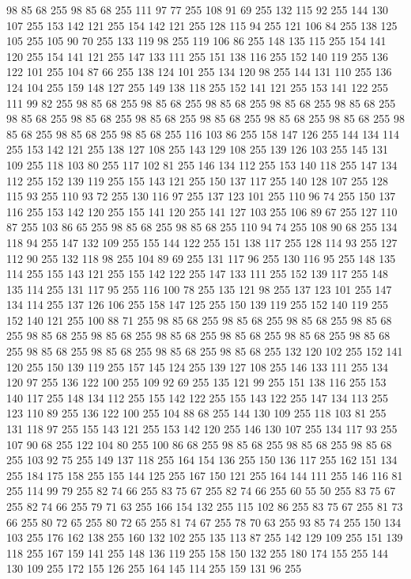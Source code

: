 98 85 68 255 98 85 68 255 111 97 77 255 108 91 69 255 132 115 92 255 144 130 107 255 153 142 121 255 154 142 121 255 128 115 94 255 121 106 84 255 138 125 105 255 105 90 70 255 133 119 98 255 119 106 86 255 148 135 115 255 154 141 120 255 154 141 121 255 147 133 111 255 151 138 116 255 152 140 119 255 136 122 101 255 104 87 66 255 138 124 101 255 134 120 98 255 144 131 110 255 136 124 104 255 159 148 127 255 149 138 118 255 152 141 121 255 153 141 122 255 111 99 82 255 98 85 68 255 98 85 68 255 98 85 68 255 98 85 68 255 98 85 68 255 98 85 68 255 98 85 68 255 98 85 68 255 98 85 68 255 98 85 68 255 98 85 68 255 98 85 68 255 98 85 68 255 98 85 68 255 116 103 86 255 158 147 126 255 144 134 114 255 153 142 121 255 138 127 108 255 143 129 108 255 139 126 103 255 145 131 109 255 118 103 80 255 117 102 81 255 146 134 112 255 153 140 118 255 147 134 112 255 152 139 119 255 155 143 121 255 150 137 117 255 140 128 107 255 128 115 93 255 110 93 72 255
130 116 97 255 137 123 101 255 110 96 74 255 150 137 116 255 153 142 120 255 155 141 120 255 141 127 103 255 106 89 67 255 127 110 87 255 103 86 65 255 98 85 68 255 98 85 68 255 110 94 74 255 108 90 68 255 134 118 94 255 147 132 109 255 155 144 122 255 151 138 117 255 128 114 93 255 127 112 90 255 132 118 98 255 104 89 69 255 131 117 96 255 130 116 95 255 148 135 114 255 155 143 121 255 155 142 122 255 147 133 111 255 152 139 117 255 148 135 114 255 131 117 95 255 116 100 78 255 135 121 98 255 137 123 101 255 147 134 114 255 137 126 106 255 158 147 125 255 150 139 119 255 152 140 119 255 152 140 121 255 100 88 71 255 98 85 68 255 98 85 68 255 98 85 68 255 98 85 68 255 98 85 68 255 98 85 68 255 98 85 68 255 98 85 68 255 98 85 68 255 98 85 68 255 98 85 68 255 98 85 68 255 98 85 68 255 98 85 68 255 132 120 102 255 152 141 120 255 150 139 119 255 157 145 124 255 139 127 108 255 146 133 111 255 134 120 97 255 136 122 100 255 109 92 69 255
135 121 99 255 151 138 116 255 153 140 117 255 148 134 112 255 155 142 122 255 155 143 122 255 147 134 113 255 123 110 89 255 136 122 100 255 104 88 68 255 144 130 109 255 118 103 81 255 131 118 97 255 155 143 121 255 153 142 120 255 146 130 107 255 134 117 93 255 107 90 68 255 122 104 80 255 100 86 68 255 98 85 68 255 98 85 68 255 98 85 68 255 103 92 75 255 149 137 118 255 164 154 136 255 150 136 117 255 162 151 134 255 184 175 158 255 155 144 125 255 167 150 121 255 164 144 111 255 146 116 81 255 114 99 79 255 82 74 66 255 83 75 67 255 82 74 66 255 60 55 50 255 83 75 67 255 82 74 66 255 79 71 63 255 166 154 132 255 115 102 86 255 83 75 67 255 81 73 66 255 80 72 65 255 80 72 65 255 81 74 67 255 78 70 63 255 93 85 74 255 150 134 103 255 176 162 138 255 160 132 102 255 135 113 87 255 142 129 109 255 151 139 118 255 167 159 141 255 148 136 119 255 158 150 132 255 180 174 155 255 144 130 109 255 172 155 126 255 164 145 114 255 159 131 96 255

